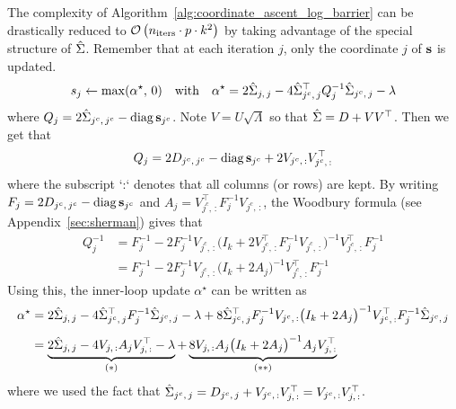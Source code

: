 The complexity of Algorithm~\ref{alg:coordinate_ascent_log_barrier} can be drastically reduced
to $\mathcal{O}\left( n_\text{iters} \cdot p \cdot k^2 \right)$
by taking advantage of the special structure of $\hat{\Sigma}$.
Remember that at each iteration $j$,
only the coordinate $j$ of $\mathbf{s}$ is updated.
\begin{equation*}
    s_j \leftarrow \max(\alpha^\star,\, 0)
    \quad\text{with}\quad
    \alpha^\star = 2\hat{\Sigma}_{j,\, j} - 4\hat{\Sigma}_{j^c,\, j}^\top Q_j^{-1} \hat{\Sigma}_{j^c,\, j} - \lambda
\end{equation*}
where $Q_j = 2\hat{\Sigma}_{j^c,\, j^c} - \operatorname*{diag}\mathbf{s}_{j^c}$.
Note $V = U \sqrt{\Lambda}$ so that $\hat{\Sigma} = D + VV^\top$.
Then we get that
\begin{equation*}
    Q_j = 2D_{j^c,\, j^c} - \operatorname*{diag}\mathbf{s}_{j^c} + 2V_{j^c,\, :}V_{j^c,\, :}^\top
\end{equation*}
where the subscript `:` denotes that all columns (or rows) are kept.
By writing $F_j = 2D_{j^c,\, j^c} - \operatorname*{diag}\mathbf{s}_{j^c}$ and $A_j = V_{j^c,\, :}^\top F_j^{-1} V_{j^c,\, :}$,
the Woodbury formula (see Appendix~\ref{sec:sherman}) gives that
\begin{align*}
    Q_j^{-1} &=
        F_j^{-1} - 2F_j^{-1}V_{j^c,\, :}
            \big( I_k + 2V_{j^c,\, :}^\top F_j^{-1} V_{j^c,\, :} \big)^{-1}
                V_{j^c,\, :}^\top F_j^{-1}\\
    &= F_j^{-1} - 2F_j^{-1}V_{j^c,\, :}
        \big( I_k + 2A_j \big)^{-1}
            V_{j^c,\, :}^\top F_j^{-1}
\end{align*}
Using this, the inner-loop update $\alpha^\star$ can be written as
\begin{align}\label{eq:low_rank_alpha}
    \alpha^\star &=
        2\hat{\Sigma}_{j,\, j}
        - 4\hat{\Sigma}_{j^c,\, j}^\top F_j^{-1} \hat{\Sigma}_{j^c,\, j}
        - \lambda
        + 8\hat{\Sigma}_{j^c,\, j}^\top F_j^{-1} V_{j^c,\, :}
        \big( I_k + 2A_j \big)^{-1}
        V_{j^c,\, :}^\top F_j^{-1}\hat{\Sigma}_{j^c,\, j}\nonumber\\[5pt]
    &= \underbrace{
        2\hat{\Sigma}_{j,\, j}
        - 4V_{j,\, :} A_j V_{j,\, :}^\top
        - \lambda
    }_\text{$(*)$}
    + \underbrace{8V_{j,\, :} A_j
        \big( I_k + 2A_j \big)^{-1}
        A_j V_{j,\, :}^\top
    }_\text{$(**)$}
\end{align}
where we used the fact that
$\hat{\Sigma}_{j^c,\, j} = D_{j^c,\, j} + V_{j^c,\, :}V_{j,\, :}^\top = V_{j^c,\, :}V_{j,\, :}^\top$.

